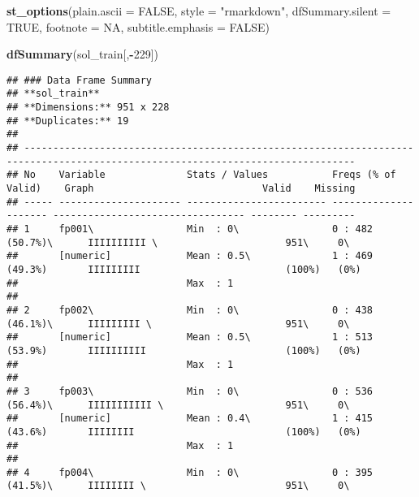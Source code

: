 \documentclass[]{article}
\newenvironment{Shaded}{\begin{snugshade}}{\end{snugshade}}
\newcommand{\DataTypeTok}[1]{\textcolor[rgb]{0.13,0.29,0.53}{#1}}
\newcommand{\DecValTok}[1]{\textcolor[rgb]{0.00,0.00,0.81}{#1}}
\newcommand{\KeywordTok}[1]{\textcolor[rgb]{0.13,0.29,0.53}{\textbf{#1}}}
\newcommand{\NormalTok}[1]{#1}
\newcommand{\OperatorTok}[1]{\textcolor[rgb]{0.81,0.36,0.00}{\textbf{#1}}}
\newcommand{\OtherTok}[1]{\textcolor[rgb]{0.56,0.35,0.01}{#1}}
\newcommand{\StringTok}[1]{\textcolor[rgb]{0.31,0.60,0.02}{#1}}
\begin{document}
\begin{Shaded}
\begin{Highlighting}[]
\KeywordTok{st_options}\NormalTok{(}\DataTypeTok{plain.ascii =} \OtherTok{FALSE}\NormalTok{,}
           \DataTypeTok{style =} \StringTok{"rmarkdown"}\NormalTok{,}
           \DataTypeTok{dfSummary.silent =} \OtherTok{TRUE}\NormalTok{,}
           \DataTypeTok{footnote =} \OtherTok{NA}\NormalTok{,}
           \DataTypeTok{subtitle.emphasis =} \OtherTok{FALSE}\NormalTok{)}

\KeywordTok{dfSummary}\NormalTok{(sol_train[,}\OperatorTok{-}\DecValTok{229}\NormalTok{])}
\end{Highlighting}
\end{Shaded}

\begin{verbatim}
## ### Data Frame Summary  
## **sol_train**   
## **Dimensions:** 951 x 228  
## **Duplicates:** 19  
## 
## -------------------------------------------------------------------------------------------------------------------------------
## No    Variable              Stats / Values           Freqs (% of Valid)    Graph                             Valid    Missing  
## ----- --------------------- ------------------------ --------------------- --------------------------------- -------- ---------
## 1     fp001\                Min  : 0\                0 : 482 (50.7%)\      IIIIIIIIII \                      951\     0\       
##       [numeric]             Mean : 0.5\              1 : 469 (49.3%)       IIIIIIIII                         (100%)   (0%)     
##                             Max  : 1                                                                                           
## 
## 2     fp002\                Min  : 0\                0 : 438 (46.1%)\      IIIIIIIII \                       951\     0\       
##       [numeric]             Mean : 0.5\              1 : 513 (53.9%)       IIIIIIIIII                        (100%)   (0%)     
##                             Max  : 1                                                                                           
## 
## 3     fp003\                Min  : 0\                0 : 536 (56.4%)\      IIIIIIIIIII \                     951\     0\       
##       [numeric]             Mean : 0.4\              1 : 415 (43.6%)       IIIIIIII                          (100%)   (0%)     
##                             Max  : 1                                                                                           
## 
## 4     fp004\                Min  : 0\                0 : 395 (41.5%)\      IIIIIIII \                        951\     0\       

\end{verbatim}
\end{document}
